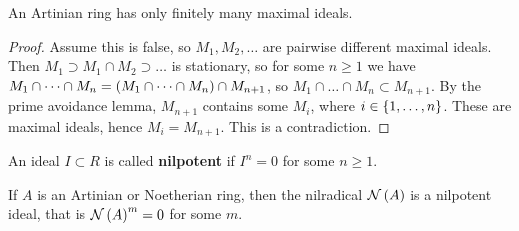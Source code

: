 \begin{lemma}
\label{lem:13.9}
An Artinian ring has only finitely many maximal ideals.
\end{lemma}

\begin{proof}
Assume this is false, so $ M_1, M_2, \dots $ are pairwise different maximal ideals. Then $ M_1 \supset M_1 \cap M_2 \supset \dots $ is stationary, so for some $ n \ge 1 $ we have $ M_1 \cap \dots \cap M_n = \br{M_1 \cap \dots \cap M_n} \cap M_{n + 1} $, so $ M_1 \cap \dots \cap M_n \subset M_{n + 1} $. By the prime avoidance lemma, $ M_{n + 1} $ contains some $ M_i $, where $ i \in \cbr{1, \dots, n} $. These are maximal ideals, hence $ M_i = M_{n + 1} $. This is a contradiction.
\end{proof}

\begin{definition*}
An ideal $ I \subset R $ is called \textbf{nilpotent} if $ I^n = 0 $ for some $ n \ge 1 $.
\end{definition*}

\begin{lemma}
\label{lem:13.10}
If $ A $ is an Artinian or Noetherian ring, then the nilradical $ \NNN\br{A} $ is a nilpotent ideal, that is $ \NNN\br{A}^m = 0 $ for some $ m $.
\end{lemma}

